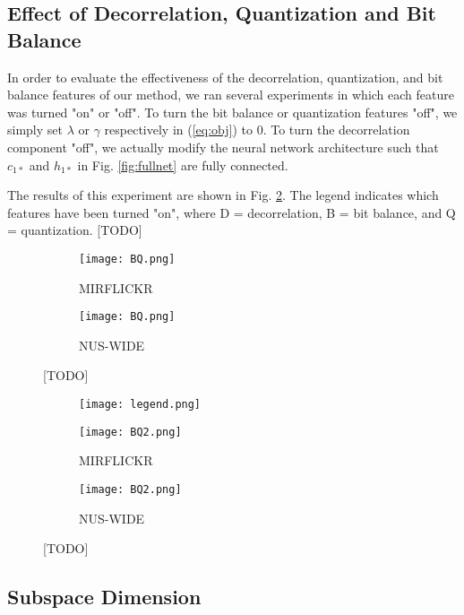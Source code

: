 \documentclass[letterpaper]{article}
\begin{document}
\subsection{Effect of Decorrelation, Quantization and Bit Balance}

In order to evaluate the effectiveness of the decorrelation, quantization, and bit balance features of our method, we ran several experiments in which each feature was turned "on" or "off". To turn the bit balance or quantization features "off", we simply set $ \lambda $ or $ \gamma $ respectively in (\ref{eq:obj}) to 0. To turn the decorrelation component "off", we actually modify the neural network architecture such that $ c_{1*} $ and $ h_{1*} $ in Fig. \ref{fig:fullnet} are fully connected.

The results of this experiment are shown in Fig. \ref{fig:BQ2}. The legend indicates which features have been turned "on", where D = decorrelation, B = bit balance, and Q = quantization. [TODO]

\begin{figure}
	
	\begin{subfigure}{\columnwidth}
		\texttt{[image: BQ.png]}
		\caption{MIRFLICKR}
	\end{subfigure}
	\begin{subfigure}{\columnwidth}
		\texttt{[image: BQ.png]}
		\caption{NUS-WIDE}
	\end{subfigure}
	\caption{\label{fig:BQ}[TODO]}
	
\end{figure}

\begin{figure}
	
	\begin{subfigure}{\columnwidth}
		\centering
		\texttt{[image: legend.png]}
	\end{subfigure}	
	\begin{subfigure}{0.5\columnwidth}
		\texttt{[image: BQ2.png]}
		\caption{MIRFLICKR}
	\end{subfigure}
	\begin{subfigure}{0.5\columnwidth}
		\texttt{[image: BQ2.png]}
		\caption{NUS-WIDE}
	\end{subfigure}
	\caption{\label{fig:BQ2}[TODO]}
	
\end{figure}

\subsection{Subspace Dimension}
\end{document}
